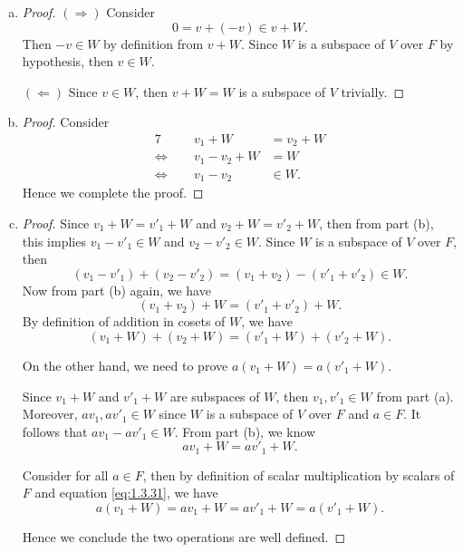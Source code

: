 \begin{Exercise}
\begin{enumerate}[(a)]
\item 
\begin{proof}
$(\Longrightarrow)$
Consider
$$
0 = v + (-v) \in v+W.
$$
Then $-v\in W$ by definition from $v+W$. Since $W$ is a subspace of $V$ over $F$ by hypothesis, then $v\in W$.

\vspace{2ex}

$(\Longleftarrow)$
Since $v\in W$, then $v+W = W$ is a subspace of $V$ trivially.
\end{proof}

\item 
\begin{proof}
Consider
\begin{alignat*}{7}
\quad&& v_1 + W &= v_2 + W \\
\iff&& v_1-v_2 + W &= W \\
\iff&& v_1-v_2 &\in W.
\end{alignat*}
Hence we complete the proof.
\end{proof}

\item
\begin{proof}
Since $v_1+W=v'_1+W$ and $v_2+W=v'_2+W$, then from part (b), this implies $v_1-v'_1\in W$ and $v_2-v'_2\in W$. Since $W$ is a subspace of $V$ over $F$, then
$$
(v_1-v'_1)+(v_2-v'_2)
= (v_1+v_2)-(v'_1+v'_2)\in W.
$$
Now from part (b) again, we have
$$
(v_1+v_2)+W = (v'_1+v'_2)+W.
$$
By definition of addition in cosets of $W$, we have
$$
(v_1+W)+(v_2+W) = (v'_1+W)+(v'_2+W).
$$

On the other hand, we need to prove $a(v_1+W) = a(v'_1+W)$.

Since $v_1+W$ and $v'_1+W$ are subspaces of $W$, then $v_1,v'_1\in W$ from part (a). Moreover, $a v_1, a v'_1\in W$ since $W$ is a subspace of $V$ over $F$ and $a\in F$. It follows that $a v_1-a v'_1\in W$. From part (b), we know
\begin{equation}\label{eq:1.3.31}
a v_1+W = a v'_1+W.
\end{equation}

Consider for all $a\in F$, then by definition of scalar multiplication by scalars of $F$ and equation \eqref{eq:1.3.31}, we have
$$
a(v_1+W)
= a v_1 + W
= a v'_1 + W
= a(v'_1 + W).
$$

Hence we conclude the two operations are well defined.
\end{proof}


\end{enumerate}
\end{Exercise}
